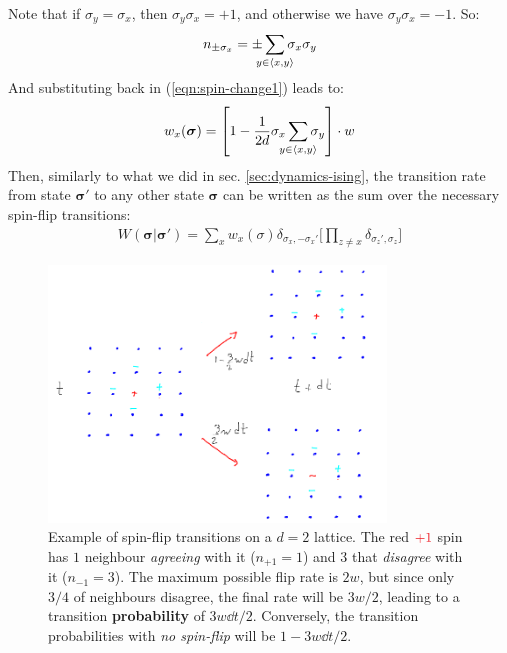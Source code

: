 \documentclass[../../main.tex]{subfiles}
\begin{document}
Note that if $\sigma_y = \sigma_x$, then $\sigma_y \sigma_x = +1$, and otherwise we have $\sigma_y \sigma_x = -1$. So:
\begin{align*}
    n_{\pm \sigma_x} = \pm \sum_{\mathclap{y \in \langle x,y \rangle}} \sigma_x \sigma_y
\end{align*}
And substituting back in (\ref{eqn:spin-change1}) leads to:
\begin{align}\label{eqn:spin-change2}
    w_x(\bm{\sigma}) = \left[1 - \frac{1}{2d} \sigma_x \sum_{\mathclap{y \in \langle x,y \rangle}} \sigma_y \right] \cdot w
\end{align}
Then, similarly to what we did in sec. \ref{sec:dynamics-ising}, the transition rate from state $\bm{\sigma'}$ to any other state $\bm{\sigma}$ can be written as the sum over the necessary spin-flip transitions:
\begin{align*}
    W(\bm{\sigma}|\bm{\sigma'}) = \sum_x w_x(\sigma) \delta_{\sigma_x, -\sigma_x'}\Big[ \prod_{z \neq x} \delta_{\sigma_z', \sigma_z} \Big]
\end{align*}

\begin{figure}[H]
    \centering
    \includegraphics[width=0.8\textwidth]{spin-flips.png}
    \caption{Example of spin-flip transitions on a $d=2$ lattice. The red $\textcolor{Red}{+1}$ spin has $1$ neighbour \textit{agreeing} with it ($n_{+1} = 1$) and $3$ that \textit{disagree} with it ($n_{-1} = 3$). The maximum possible flip rate is $2w$, but since only $3/4$ of neighbours disagree, the final rate will be $3w/2$, leading to a transition \textbf{probability} of $3w \dd{t}/2$. Conversely, the transition probabilities with \textit{no spin-flip} will be $1-3w\dd{t}/2$.}
    \label{fig:spin-flips}
\end{figure}
\end{document}
